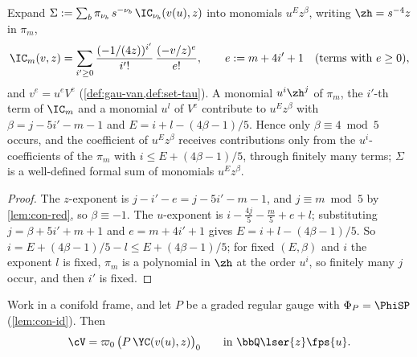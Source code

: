 
\begin{lem}
\label{lem:con-key}
Expand $\Sigma:=\sum_b\pi_{\nu_b}\,s^{-\nu_b}\,\IC_{\nu_b}(v(u),z)$ into monomials $u^Ez^\beta$, writing $\zh=s^{-4}z$ in $\pi_m$,
\[
\IC_m(v,z)=\sum_{i'\geq0}\frac{(-1/(4z))^{i'}}{i'!}\,\frac{(-v/z)^e}{e!},\qquad e:=m+4i'+1\quad(\text{terms with }e\geq0),
\]
and $v^e=u^eV^e$ (\cref{def:gau-van,def:set-tau}). A monomial $u^i\zh^j$ of $\pi_m$, the $i'$-th term of $\IC_m$ and a monomial $u^l$ of $V^e$ contribute to $u^Ez^\beta$ with $\beta=j-5i'-m-1$ and $E=i+l-(4\beta-1)/5$. Hence only $\beta\equiv4\bmod5$ occurs, and the coefficient of $u^Ez^\beta$ receives contributions only from the $u^i$-coefficients of the $\pi_m$ with $i\leq E+(4\beta-1)/5$, through finitely many terms; $\Sigma$ is a well-defined formal sum of monomials $u^Ez^\beta$.
\end{lem}

\begin{proof}
The $z$-exponent is $j-i'-e=j-5i'-m-1$, and $j\equiv m\bmod5$ by \cref{lem:con-red}, so $\beta\equiv-1$. The $u$-exponent is $i-\frac{4j}5-\frac m5+e+l$; substituting $j=\beta+5i'+m+1$ and $e=m+4i'+1$ gives $E=i+l-(4\beta-1)/5$. So $i=E+(4\beta-1)/5-l\leq E+(4\beta-1)/5$; for fixed $(E,\beta)$ and $i$ the exponent $l$ is fixed, $\pi_m$ is a polynomial in $\zh$ at the order $u^i$, so finitely many $j$ occur, and then $i'$ is fixed.
\end{proof}

\begin{prop}
\label{prop:con-res}
Work in a conifold frame, and let $P$ be a graded regular gauge with $\Phi_P=\PhiSP$ (\cref{lem:con-id}). Then
\[
\cV=\varpi_0\,\bigl(P\,\YC(v(u),z)\bigr)_0\qquad\text{in }\bbQ\lser{z}\fps{u}.
\]
\end{prop}

